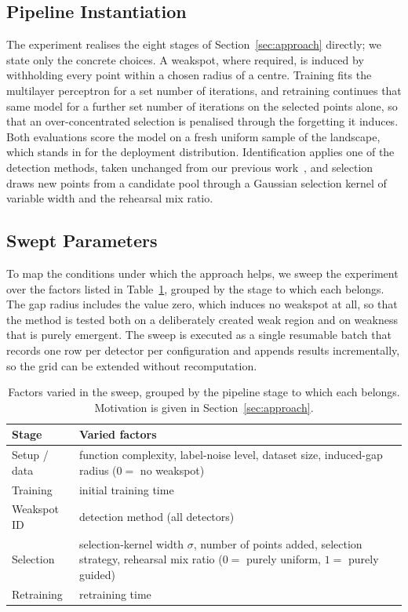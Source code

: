 \documentclass[conference]{IEEEtran}
\begin{document}
\subsection{Pipeline Instantiation}
The experiment realises the eight stages of Section~\ref{sec:approach} directly; we
state only the concrete choices. A weakspot, where required, is induced by withholding
every point within a chosen radius of a centre. Training fits the multilayer perceptron
for a set number of iterations, and retraining continues that same model for a further
set number of iterations on the selected points alone, so that an over-concentrated
selection is penalised through the forgetting it induces. Both evaluations score the
model on a fresh uniform sample of the landscape, which stands in for the deployment
distribution. Identification applies one of the detection methods, taken unchanged from
our previous work~\cite{weakspotprior}, and selection draws new points from a candidate
pool through a Gaussian selection kernel of variable width and the rehearsal mix ratio.

\subsection{Swept Parameters}
To map the conditions under which the approach helps, we sweep the experiment over
the factors listed in Table~\ref{tab:sweep}, grouped by the stage to which each
belongs. The gap radius
includes the value zero, which induces no weakspot at all, so that the method is
tested both on a deliberately created weak region and on weakness that is purely
emergent. The sweep is executed as a single resumable batch that
records one row per detector per configuration and appends results incrementally,
so the grid can be extended without recomputation.

\begin{table}[t]
\centering
\caption{Factors varied in the sweep, grouped by the pipeline stage to which each
belongs. Motivation is given in Section~\ref{sec:approach}.}
\label{tab:sweep}
\begin{tabular}{@{}l p{}@{}}
\toprule
\textbf{Stage} & \textbf{Varied factors} \\
\midrule
Setup / data & function complexity, label-noise level, dataset size,
               induced-gap radius ($0 =$ no weakspot) \\
Training     & initial training time \\
Weakspot ID  & detection method (all detectors) \\
Selection    & selection-kernel width $\sigma$, number of points added, selection
               strategy, rehearsal mix ratio ($0 =$ purely uniform, $1 =$ purely
               guided) \\
Retraining   & retraining time \\
\bottomrule
\end{tabular}
\end{table}
\end{document}

